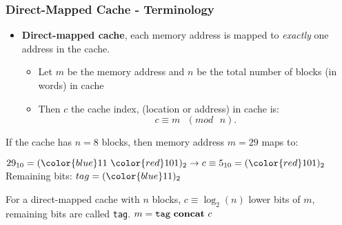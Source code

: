 \begin{frame}\frametitle{Direct-Mapped Cache - Terminology}
\begin{itemize}
\item \textbf{Direct-mapped cache}, each memory address is mapped to \textit{exactly} one address in the cache.
\begin{itemize}
\item Let $m$ be the memory address and $n$ be the total number of blocks (in words) in cache
\item Then $c$ the cache index, (location or address) in cache is:
$$c \equiv m \text{ } (mod \text{ } n) .$$
\end{itemize}
\end{itemize}
 
  \begin{tcolorbox}[enhanced,attach boxed title to top center={yshift=-3mm,yshifttext=-1mm},
  colback=red!5!white,colframe=red!75!black,colbacktitle=red!80!black,
  title=Try this,fonttitle=\bfseries,
  boxed title style={size=small,colframe=red!50!black} ]
If the cache has $n=8$ blocks, then memory address $m=29$ maps to:
\ifnum{}\fi
\end{tcolorbox}
{\footnotesize
$29_{10}=({\color{blue}11}~{\color{red}101})_2 \rightarrow c \equiv 5_{10} = ({\color{red}101})_2$ \\Remaining bits: $tag = ({\color{blue}11})_2$
}
 \begin{tcolorbox}[enhanced,attach boxed title to top center={yshift=-3mm,yshifttext=-1mm},
  colback=green!5!white,colframe=green!75!black,colbacktitle=green!80!black,
  title=Remember It,fonttitle=\bfseries,
  boxed title style={size=small,colframe=green!50!black} ]
For a direct-mapped cache with $n$ blocks,  $c \equiv \log_2 (n)$ lower bits of $m$, remaining bits are called {\tt tag}. $m = \texttt{tag} \text{ \textbf{concat}  } c$
\end{tcolorbox}

\end{frame}

